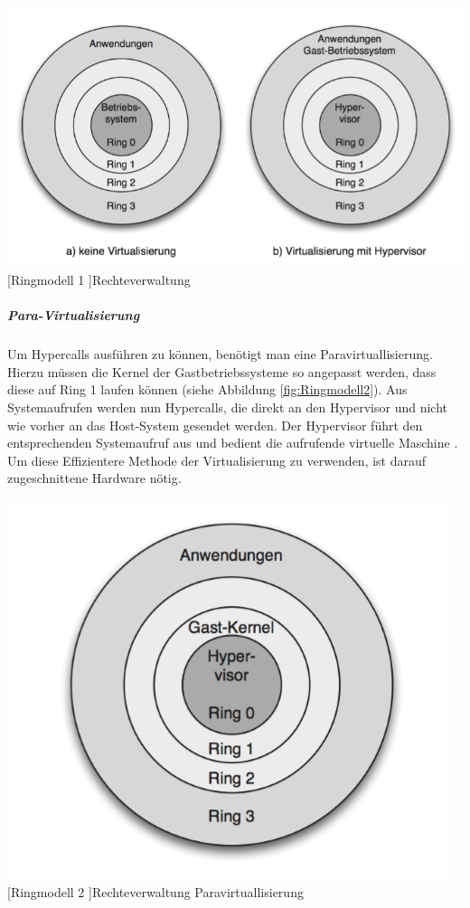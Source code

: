  \vspace{1em}
\begin{minipage}{\linewidth}
	\centering
	\includegraphics[width=1\linewidth]{pics/Ringmodell1.PNG}
	[Ringmodell 1 ]{Rechteverwaltung \cite{Meinel2011VirtualisierungMarktubersicht} }
	\label{fig:Ringmodell1}
\end{minipage}
 
 \subparagraph{Para-Virtualisierung}
 Um Hypercalls ausführen zu können, benötigt man eine Paravirtuallisierung. Hierzu müssen die Kernel der Gastbetriebssysteme so angepasst werden, dass diese auf Ring 1 laufen können (siehe Abbildung \ref{fig:Ringmodell2}). Aus Systemaufrufen werden nun Hypercalls, die direkt an den Hypervisor und nicht wie vorher an das Host-System gesendet werden. Der Hypervisor führt den entsprechenden Systemaufruf aus und bedient die aufrufende virtuelle Maschine \cite{Meinel2011VirtualisierungMarktubersicht}. Um diese Effizientere Methode der Virtualisierung zu verwenden, ist darauf zugeschnittene Hardware nötig.

 \vspace{1em}
\begin{minipage}{\linewidth}
	\centering
	\includegraphics[width=0.5\linewidth]{pics/Ringmodell2.PNG}
	[Ringmodell 2 ]{Rechteverwaltung Paravirtuallisierung \cite{Meinel2011VirtualisierungMarktubersicht} }
	\label{fig:Ringmodell2}
\end{minipage}
 
